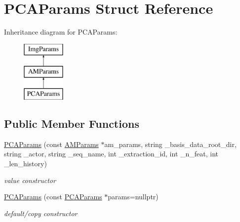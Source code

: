\hypertarget{structPCAParams}{\section{P\-C\-A\-Params Struct Reference}
\label{structPCAParams}
}
Inheritance diagram for P\-C\-A\-Params\-:\begin{figure}[H]
\begin{center}
\leavevmode
\includegraphics[height=3.000000cm]{structPCAParams}
\end{center}
\end{figure}
\subsection*{Public Member Functions}
\begin{DoxyCompactItemize}
\item 
\hypertarget{structPCAParams_a024b405eca4664f3ba321659607dc8a0}{\hyperlink{structPCAParams_a024b405eca4664f3ba321659607dc8a0}{P\-C\-A\-Params} (const \hyperlink{structAMParams}{A\-M\-Params} $\ast$am\-\_\-params, string \-\_\-basis\-\_\-data\-\_\-root\-\_\-dir, string \-\_\-actor, string \-\_\-seq\-\_\-name, int \-\_\-extraction\-\_\-id, int \-\_\-n\-\_\-feat, int \-\_\-len\-\_\-history)}\label{structPCAParams_a024b405eca4664f3ba321659607dc8a0}

\begin{DoxyCompactList}\small\item\em value constructor \end{DoxyCompactList}\item 
\hypertarget{structPCAParams_a8a0885e3a10e37357d45fe3a49f78d63}{\hyperlink{structPCAParams_a8a0885e3a10e37357d45fe3a49f78d63}{P\-C\-A\-Params} (const \hyperlink{structPCAParams}{P\-C\-A\-Params} $\ast$params=nullptr)}\label{structPCAParams_a8a0885e3a10e37357d45fe3a49f78d63}

\begin{DoxyCompactList}\small\item\em default/copy constructor \end{DoxyCompactList}\end{DoxyCompactItemize}
